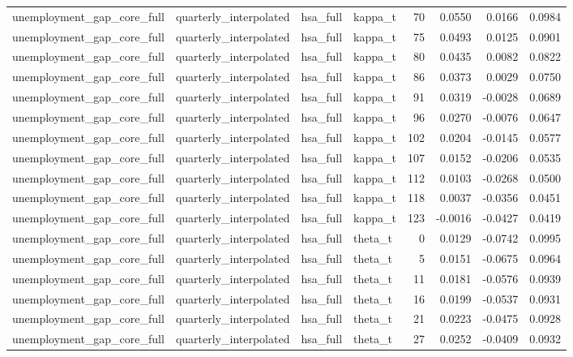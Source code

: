 \begin{tabular}{llllrrrr}
unemployment\_gap\_core\_full & quarterly\_interpolated & hsa\_full & kappa\_t & 70 & 0.0550 & 0.0166 & 0.0984 \\
unemployment\_gap\_core\_full & quarterly\_interpolated & hsa\_full & kappa\_t & 75 & 0.0493 & 0.0125 & 0.0901 \\
unemployment\_gap\_core\_full & quarterly\_interpolated & hsa\_full & kappa\_t & 80 & 0.0435 & 0.0082 & 0.0822 \\
unemployment\_gap\_core\_full & quarterly\_interpolated & hsa\_full & kappa\_t & 86 & 0.0373 & 0.0029 & 0.0750 \\
unemployment\_gap\_core\_full & quarterly\_interpolated & hsa\_full & kappa\_t & 91 & 0.0319 & -0.0028 & 0.0689 \\
unemployment\_gap\_core\_full & quarterly\_interpolated & hsa\_full & kappa\_t & 96 & 0.0270 & -0.0076 & 0.0647 \\
unemployment\_gap\_core\_full & quarterly\_interpolated & hsa\_full & kappa\_t & 102 & 0.0204 & -0.0145 & 0.0577 \\
unemployment\_gap\_core\_full & quarterly\_interpolated & hsa\_full & kappa\_t & 107 & 0.0152 & -0.0206 & 0.0535 \\
unemployment\_gap\_core\_full & quarterly\_interpolated & hsa\_full & kappa\_t & 112 & 0.0103 & -0.0268 & 0.0500 \\
unemployment\_gap\_core\_full & quarterly\_interpolated & hsa\_full & kappa\_t & 118 & 0.0037 & -0.0356 & 0.0451 \\
unemployment\_gap\_core\_full & quarterly\_interpolated & hsa\_full & kappa\_t & 123 & -0.0016 & -0.0427 & 0.0419 \\
unemployment\_gap\_core\_full & quarterly\_interpolated & hsa\_full & theta\_t & 0 & 0.0129 & -0.0742 & 0.0995 \\
unemployment\_gap\_core\_full & quarterly\_interpolated & hsa\_full & theta\_t & 5 & 0.0151 & -0.0675 & 0.0964 \\
unemployment\_gap\_core\_full & quarterly\_interpolated & hsa\_full & theta\_t & 11 & 0.0181 & -0.0576 & 0.0939 \\
unemployment\_gap\_core\_full & quarterly\_interpolated & hsa\_full & theta\_t & 16 & 0.0199 & -0.0537 & 0.0931 \\
unemployment\_gap\_core\_full & quarterly\_interpolated & hsa\_full & theta\_t & 21 & 0.0223 & -0.0475 & 0.0928 \\
unemployment\_gap\_core\_full & quarterly\_interpolated & hsa\_full & theta\_t & 27 & 0.0252 & -0.0409 & 0.0932 \\

\end{tabular}
